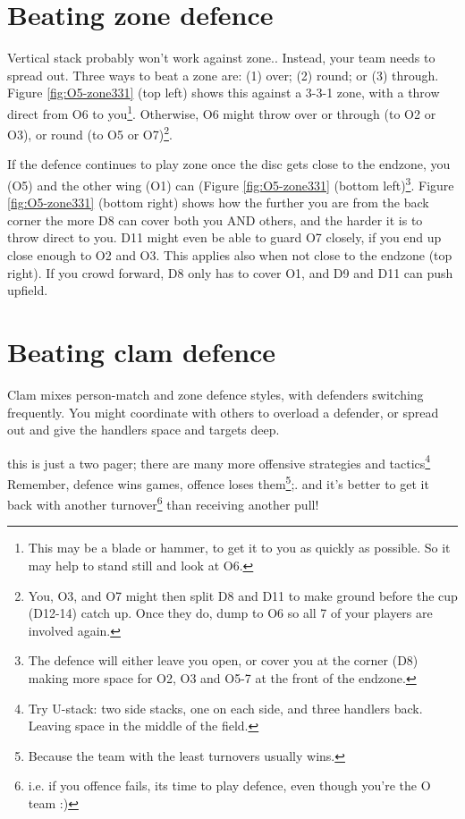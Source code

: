 \documentclass{tufte-handout}
\begin{document}
\section{Beating zone defence}\label{sec:zone}
Vertical stack 
probably won't work 
against zone.. 
Instead, your 
team needs to 
spread out. 
Three ways to beat a zone are:
(1) over;
(2) round; or
(3) through. 
Figure \ref{fig:O5-zone331}
(top left)
shows this 
against a 
3-3-1 zone, 
with a throw 
direct 
from O6 
 to you\footnote{
This may be a 
blade or
hammer, 
to get it 
to you
as quickly as possible.
So it may help to 
stand still 
and look at O6.}.
Otherwise, 
O6 might throw
over or through (to O2 or O3), 
or round (to O5 or O7)\footnote{
You, 
O3, 
and O7
might then split
D8 and D11 
to make ground 
before the cup 
(D12-14) catch up. 
Once they do, 
dump to O6 
so all 7 of your players
are involved again.}. 

If the defence 
continues to play zone 
once the disc 
gets close to the endzone, 
you (O5) 
and the other wing (O1) 
can 
(Figure \ref{fig:O5-zone331} (bottom left)\footnote{ 
The defence 
will either  
leave you open,
or cover you
at the corner
(D8)
making more space 
for O2, 
O3 and
O5-7 
at the front of the endzone.}.
Figure \ref{fig:O5-zone331} (bottom right) shows 
how the further 
you are from the back corner 
the more D8  
can cover both you
AND others, 
and the harder 
it is to throw direct to you.
D11 might even be able to
guard O7 closely, if 
you end up close enough to 
O2 and O3. 
This applies also when 
not close to the endzone 
(top right).
If you crowd forward,
D8 only has to cover O1, 
and D9 and D11 
can push upfield.


\section{Beating clam defence}\label{sec:zone}
Clam mixes person-match 
and zone defence styles, 
with defenders 
switching frequently.
You might
coordinate 
with others  
to overload 
a defender, 
or spread out 
and give the handlers 
space 
and targets deep. 

this is just a two pager; 
there are many more 
offensive strategies 
and tactics\footnote{
Try U-stack: two side stacks, 
one on each side, and
three handlers back.  
Leaving space in the middle of the field. }
Remember, 
defence wins games, 
offence loses them\footnote{
Because the team with the least turnovers 
usually wins.};.
and it's better to get it back 
with another turnover\footnote{
i.e. if you offence fails, its time to play defence, even though you're the O team :)}
than receiving another pull!
\end{document}
